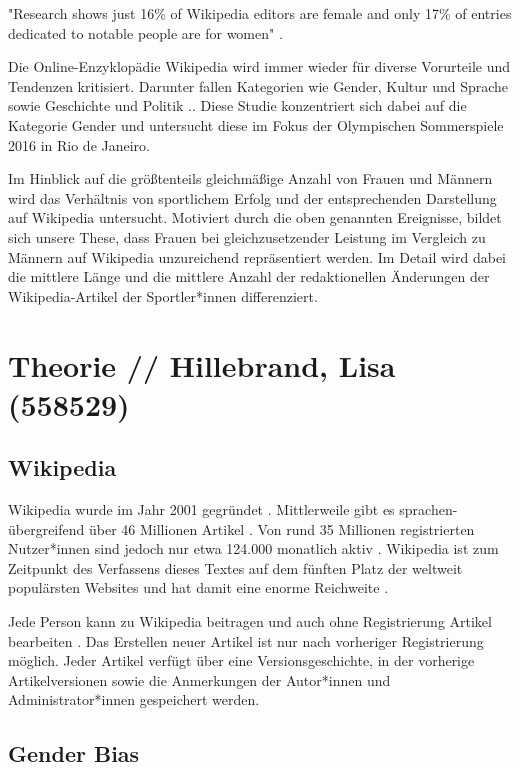 \documentclass[11pt]{article}
\begin{document}
"Research shows just 16\% of Wikipedia editors are female and only 17\% of entries dedicated to notable people are for women" \parencite{PoppyNoor}.

Die Online-Enzyklopädie Wikipedia wird immer wieder für diverse Vorurteile und Tendenzen kritisiert. Darunter fallen Kategorien wie Gender, Kultur und Sprache sowie Geschichte und Politik \parencite{PoppyNoor}.. Diese Studie konzentriert sich dabei auf die Kategorie Gender und untersucht diese im Fokus der Olympischen Sommerspiele 2016 in Rio de Janeiro.

Im Hinblick auf die größtenteils gleichmäßige Anzahl von Frauen und Männern wird das Verhältnis von sportlichem Erfolg und der entsprechenden Darstellung auf Wikipedia untersucht. Motiviert durch die oben genannten Ereignisse, bildet sich unsere These, dass Frauen bei gleichzusetzender Leistung im Vergleich zu Männern auf Wikipedia unzureichend repräsentiert werden. Im Detail wird dabei die mittlere Länge und die mittlere Anzahl der redaktionellen Änderungen der Wikipedia-Artikel der Sportler*innen differenziert.

\section {Theorie // Hillebrand, Lisa (558529)}
\label{intro}
\subsection {Wikipedia}
Wikipedia wurde im Jahr 2001 gegründet \parencite{wikipediaTimeline}. Mittlerweile gibt es sprachen- übergreifend über 46 Millionen Artikel \parencite{wikipedia_Size}. Von rund 35 Millionen registrierten Nutzer*innen sind jedoch nur etwa 124.000 monatlich aktiv \parencite{wikipedians}. Wikipedia ist zum Zeitpunkt des Verfassens dieses Textes auf dem fünften Platz der weltweit populärsten Websites und hat damit eine enorme Reichweite \parencite{Alexa2019}.

Jede Person kann zu Wikipedia beitragen und auch ohne Registrierung Artikel bearbeiten \parencite{wikipediaTutorial}. Das Erstellen neuer Artikel ist nur nach vorheriger Registrierung möglich. Jeder Artikel verfügt über eine Versionsgeschichte, in der vorherige Artikelversionen sowie die Anmerkungen der Autor*innen und Administrator*innen gespeichert werden.

\subsection {Gender Bias}
\end{document}
